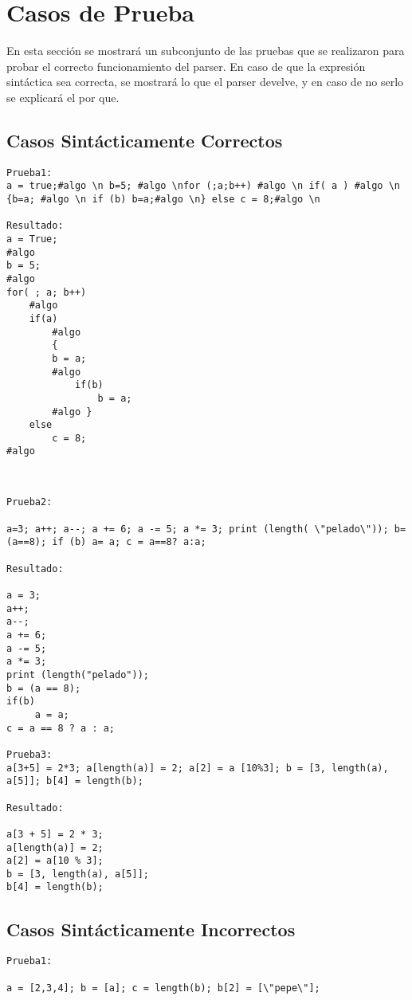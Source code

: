 \section{Casos de Prueba}

En esta sección se mostrará un subconjunto de las pruebas que se realizaron para probar el correcto funcionamiento del parser. En caso de que la expresión sintáctica sea correcta, se mostrará lo que el parser develve, y en caso de no serlo se explicará el por que.

\subsection{Casos Sintácticamente Correctos}

\begin{lstlisting}
Prueba1:
a = true;#algo \n b=5; #algo \nfor (;a;b++) #algo \n if( a ) #algo \n {b=a; #algo \n if (b) b=a;#algo \n} else c = 8;#algo \n

Resultado:
a = True;
#algo 
b = 5;
#algo 
for( ; a; b++)
	#algo 
	if(a)
		#algo 
		{
		b = a;
		#algo 
			if(b)
				b = a;
		#algo }
	else
		c = 8;
#algo 
\end{lstlisting}

\begin{verbatim}


Prueba2:

a=3; a++; a--; a += 6; a -= 5; a *= 3; print (length( \"pelado\")); b= (a==8); if (b) a= a; c = a==8? a:a;

Resultado:

a = 3;
a++;
a--;
a += 6;
a -= 5;
a *= 3;
print (length("pelado"));
b = (a == 8);
if(b)
     a = a;
c = a == 8 ? a : a;

Prueba3:
a[3+5] = 2*3; a[length(a)] = 2; a[2] = a [10%3]; b = [3, length(a), a[5]]; b[4] = length(b);

Resultado:

a[3 + 5] = 2 * 3;
a[length(a)] = 2;
a[2] = a[10 % 3];
b = [3, length(a), a[5]];
b[4] = length(b);

\end{verbatim}



\subsection{Casos Sintácticamente Incorrectos}

\begin{verbatim}
Prueba1:

a = [2,3,4]; b = [a]; c = length(b); b[2] = [\"pepe\"];

\end{verbatim}

